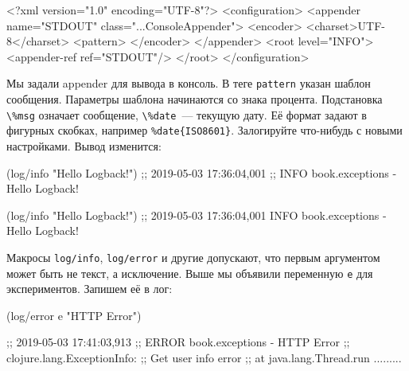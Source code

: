 \else

\begin{english}
  \begin{xml}
<?xml version="1.0" encoding="UTF-8"?>
<configuration>
  <appender name="STDOUT" class="...ConsoleAppender">
    <encoder>
      <charset>UTF-8</charset>
      <pattern>%
    </encoder>
  </appender>
  <root level="INFO">
    <appender-ref ref="STDOUT"/>
  </root>
</configuration>
  \end{xml}
\end{english}

\fi


Мы задали appender для вывода в консоль. В теге \verb|pattern| указан шаблон
сообщения. Параметры шаблона начинаются со знака процента. Подстановка
\verb|\%msg| означает сообщение, \verb|\%date|~--- текущую дату. Её
формат задают в фигурных скобках, например \verb|%date{ISO8601}|. Залогируйте
что-нибудь с новыми настройками. Вывод изменится:

\ifx\DEVICETYPE\MOBILE

\begin{english}
  \begin{clojure}
(log/info "Hello Logback!")
;; 2019-05-03 17:36:04,001
;; INFO book.exceptions - Hello Logback!
  \end{clojure}
\end{english}

\else

\begin{english}
  \begin{clojure}
(log/info "Hello Logback!")
;; 2019-05-03 17:36:04,001 INFO book.exceptions - Hello Logback!
  \end{clojure}
\end{english}

\fi

\label{log-ex-param}

Макросы \verb|log/info|, \verb|log/error| и другие допускают, что первым
аргументом может быть не текст, а исключение. Выше мы объявили переменную
\verb|e| для экспериментов. Запишем её в лог:

\ifx\DEVICETYPE\MOBILE

\begin{english}
  \begin{clojure}
(log/error e "HTTP Error")

;; 2019-05-03 17:41:03,913
;; ERROR book.exceptions - HTTP Error
;; clojure.lang.ExceptionInfo:
;; Get user info error
;; at java.lang.Thread.run .........
  \end{clojure}
\end{english}

